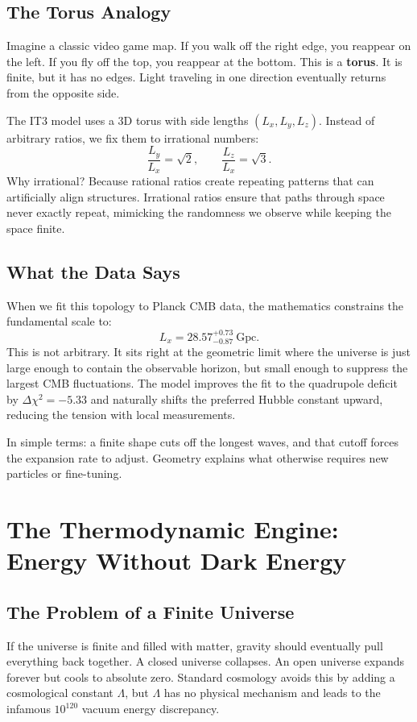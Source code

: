 \documentclass[12pt,a4paper]{report}
\begin{document}
\section{The Torus Analogy}
Imagine a classic video game map. If you walk off the right edge, you reappear on the left. If you fly off the top, you reappear at the bottom. This is a \textbf{torus}. It is finite, but it has no edges. Light traveling in one direction eventually returns from the opposite side. 

The IT3 model uses a 3D torus with side lengths $(L_x, L_y, L_z)$. Instead of arbitrary ratios, we fix them to irrational numbers:
$$
\frac{L_y}{L_x} = \sqrt{2}, \qquad \frac{L_z}{L_x} = \sqrt{3}.
$$
Why irrational? Because rational ratios create repeating patterns that can artificially align structures. Irrational ratios ensure that paths through space never exactly repeat, mimicking the randomness we observe while keeping the space finite.

\section{What the Data Says}
When we fit this topology to Planck CMB data, the mathematics constrains the fundamental scale to:
$$
L_x = 28.57^{+0.73}_{-0.87}~\text{Gpc}.
$$
This is not arbitrary. It sits right at the geometric limit where the universe is just large enough to contain the observable horizon, but small enough to suppress the largest CMB fluctuations. The model improves the fit to the quadrupole deficit by $\Delta\chi^2 = -5.33$ and naturally shifts the preferred Hubble constant upward, reducing the tension with local measurements. 

In simple terms: a finite shape cuts off the longest waves, and that cutoff forces the expansion rate to adjust. Geometry explains what otherwise requires new particles or fine-tuning.

\chapter{The Thermodynamic Engine: Energy Without Dark Energy}
\section{The Problem of a Finite Universe}
If the universe is finite and filled with matter, gravity should eventually pull everything back together. A closed universe collapses. An open universe expands forever but cools to absolute zero. Standard cosmology avoids this by adding a cosmological constant $\Lambda$, but $\Lambda$ has no physical mechanism and leads to the infamous $10^{120}$ vacuum energy discrepancy.
\end{document}
